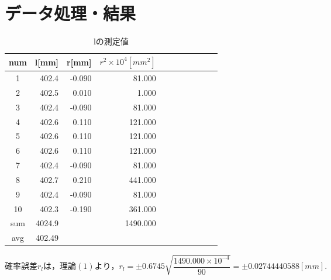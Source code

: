 \documentclass[a4paper,1pt]{jsarticle}
\begin{document}
\clearpage


\section{データ処理・結果}




\begin{table}[H]
  \caption{lの測定値}
  \label{table:SpeedOfLight}
  \centering
  \begin{tabular}{|c||r|r|r|r|r|r|r|r|r|r|}
    \hline
    num & l[mm] & r[mm] & $r^2\times10^4[mm^2]$ \\
    \hline\hline
    1 & 402.4 & -0.090 & 81.000 \\
    2 & 402.5 & 0.010 & 1.000 \\
    3 & 402.4 & -0.090 & 81.000 \\
    4 & 402.6 & 0.110 & 121.000 \\
    5 & 402.6 & 0.110 & 121.000 \\
    6 & 402.6 & 0.110 & 121.000 \\
    7 & 402.4 & -0.090 & 81.000 \\
    8 & 402.7 & 0.210 & 441.000 \\
    9 & 402.4 & -0.090 & 81.000 \\
    10 & 402.3 & -0.190 & 361.000 \\
    \hline\hline
    sum & 4024.9 &  & 1490.000 \\
    \hline
    avg & 402.49 &  &  \\

    \hline
  \end{tabular}

\end{table}


  $確率誤差r_lは，理論(1)より，r_l=\pm0.6745\sqrt{\dfrac{1490.000\times10^{-4}}{90}}=\pm0.02744440588[mm].$
\end{document}
